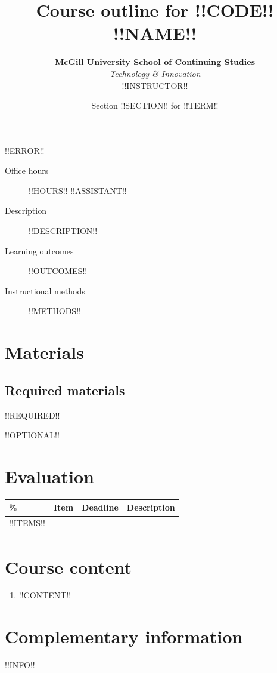 \documentclass{article}
\title{Course outline for !!CODE!! \\ {\sc !!NAME!!}}
\date{Section !!SECTION!! for !!TERM!!}
\author{{\bf McGill University School of Continuing Studies} \\
  {\em Technology \& Innovation} \\
  !!INSTRUCTOR!! }
\begin{document}
\maketitle

\thispagestyle{fancy}

!!ERROR!!

\tableofcontents

\newpage

\begin{description}
\item[Office hours]{ !!HOURS!! !!ASSISTANT!! }
\item[Description]{ !!DESCRIPTION!! }
\item[Learning outcomes]{ !!OUTCOMES!! }
\item[Instructional methods]{ !!METHODS!! }
\end{description}

\newpage

\section{Materials}

\subsection{Required materials}

!!REQUIRED!!

!!OPTIONAL!!

\newpage

\section{Evaluation}

\begin{center}
  \begin{tabular}{p{15mm}|p{30mm}|p{30mm}|p{80mm}}
    \% & Item & Deadline & Description \\
    \hline
  !!ITEMS!!
\end{tabular}
\end{center}

\newpage

\section{Course content}

\begin{enumerate}
\item{!!CONTENT!!}
\end{enumerate}

\newpage

\section{Complementary information}

!!INFO!!

\label{LastPage}
\end{document}
